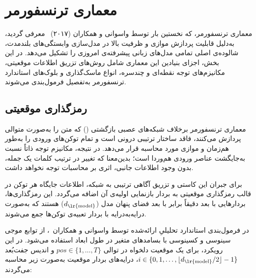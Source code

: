 \section{معماری ترنسفورمر}\label{sec:2-2}

معماری ترنسفورمر، که نخستین بار توسط واسوانی و همکاران (۲۰۱۷)~\cite{vaswani2017attention} معرفی گردید، به‌دلیل قابلیت پردازش موازی و ظرفیت بالا در مدل‌سازی وابستگی‌های بلندمدت، شالوده‌ی اصلی تمامی مدل‌های زبانی پیشرفته‌ی امروزی را تشکیل می‌دهد. در این بخش، اجزای بنیادین این معماری شامل روش‌های تزریق اطلاعات موقعیتی، مکانیزم‌های توجه نقطه‌ای و چندسره، انواع ماسک‌گذاری و بلوک‌های استاندارد ترنسفورمر به‌تفصیل فرمول‌بندی می‌شوند.


\subsection{رمزگذاری موقعیتی}\label{sec:2-2-1}

معماری ترنسفورمر برخلاف شبکه‌های عصبی بازگشتی () که متن را به‌صورت متوالی پردازش می‌کنند، فاقد ساختار ترتیبی درونی است و تمام توکن‌های ورودی را به‌طور هم‌زمان و موازی مورد محاسبه قرار می‌دهد. در نتیجه، مکانیزم توجه ذاتاً نسبت به‌جایگشت عناصر ورودی هم‌وردا است؛ بدین‌معنا که تغییر در ترتیب کلمات یک جمله، بدون وجود اطلاعات جانبی، اثری بر محاسبات توجه نخواهد داشت.

برای جبران این کاستی و تزریق آگاهی ترتیبی به شبکه، اطلاعات جایگاه هر توکن در قالب رمزگذاری موقعیتی به بردار بازنمایی اولیه‌ی آن اضافه می‌گردد. این رمزگذاری‌ها، بردارهایی با بعد دقیقاً برابر با بعد فضای پنهان مدل ($d_{\text{\lr{model}}}$) هستند که به‌صورت درایه‌به‌درایه با بردار تعبیه‌ی توکن‌ها جمع می‌شوند.

در فرمول‌بندی استاندارد تحلیلیِ ارائه‌شده توسط واسوانی و همکاران~\cite{vaswani2017attention}، از توابع موجی سینوسی و کسینوسی با بسامدهای متغیر در طول ابعاد استفاده می‌شود. در این رویکرد، برای یک موقعیت دلخواه در توالی $\mathit{pos} \in \{1, \dots, T\}$ و اندیس جفت‌بُعد $i \in \{0, 1, \dots, \lfloor d_{\text{\lr{model}}}/2 \rfloor - 1\}$، درایه‌های بردار موقعیت به‌صورت زیر محاسبه می‌گردند:

